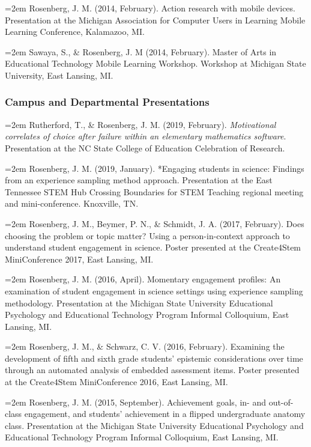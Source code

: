\documentclass[14,]{article}
\begin{document}
\hangindent=2em Rosenberg, J. M. (2014, February). Action research with
mobile devices. Presentation at the Michigan Association for Computer
Users in Learning Mobile Learning Conference, Kalamazoo, MI.

\hangindent=2em Sawaya, S., \& Rosenberg, J. M (2014, February). Master
of Arts in Educational Technology Mobile Learning Workshop. Workshop at
Michigan State University, East Lansing, MI.

\hypertarget{campus-and-departmental-presentations}{%
\subsubsection{Campus and Departmental
Presentations}\label{campus-and-departmental-presentations}}

\hangindent=2em Rutherford, T., \& Rosenberg, J. M. (2019, February).
\emph{Motivational correlates of choice after failure within an
elementary mathematics software}. Presentation at the NC State College
of Education Celebration of Research.

\hangindent=2em Rosenberg, J. M. (2019, January). *Engaging students in
science: Findings from an experience sampling method approach.
Presentation at the East Tennessee STEM Hub Crossing Boundaries for STEM
Teaching regional meeting and mini-conference. Knoxville, TN.

\hangindent=2em Rosenberg, J. M., Beymer, P. N., \& Schmidt, J. A.
(2017, February). Does choosing the problem or topic matter? Using a
person-in-context approach to understand student engagement in science.
Poster presented at the Create4Stem MiniConference 2017, East Lansing,
MI.

\hangindent=2em Rosenberg, J. M. (2016, April). Momentary engagement
profiles: An examination of student engagement in science settings using
experience sampling methodology. Presentation at the Michigan State
University Educational Psychology and Educational Technology Program
Informal Colloquium, East Lansing, MI.

\hangindent=2em Rosenberg, J. M., \& Schwarz, C. V. (2016, February).
Examining the development of fifth and sixth grade students' epistemic
considerations over time through an automated analysis of embedded
assessment items. Poster presented at the Create4Stem MiniConference
2016, East Lansing, MI.

\hangindent=2em Rosenberg, J. M. (2015, September). Achievement goals,
in- and out-of-class engagement, and students' achievement in a flipped
undergraduate anatomy class. Presentation at the Michigan State
University Educational Psychology and Educational Technology Program
Informal Colloquium, East Lansing, MI.
\end{document}
